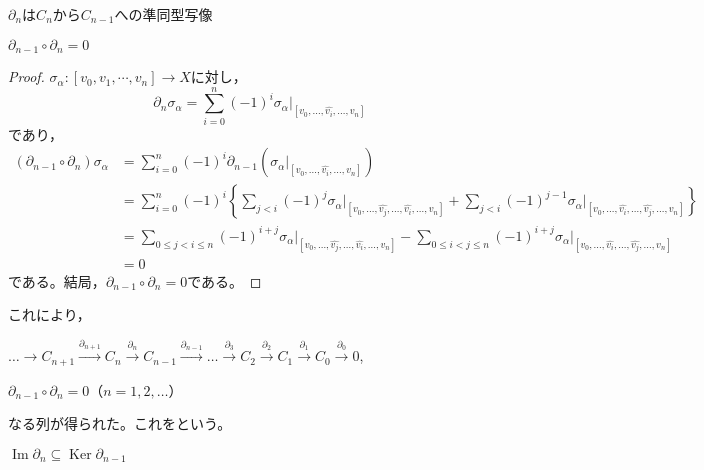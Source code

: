 \documentclass[uplatex]{jsarticle}
\renewcommand{\restriction}[2]{\left. #1 \right|_{#2}}
\DeclareMathOperator{\Image}{Im}
\DeclareMathOperator{\Kernel}{Ker}
\begin{document}
\begin{prop}
  $\partial_{n}$は$C_{n}$から$C_{n-1}$への準同型写像
\end{prop}

\begin{hodai}
  $\partial_{n-1} \circ \partial_{n} = 0$
\end{hodai}

\begin{proof}
  $\sigma_{\alpha} \colon [v_{0},v_{1},\cdots, v_{n}] \longrightarrow X$に対し，
  \begin{equation}
    \partial_{n} \sigma_{\alpha} = \sum_{i=0}^{n} (-1)^{i} \restriction{\sigma_{\alpha}}{[v_{0},\dots,\hat{v_{i}},\dots,v_{n}]}
  \end{equation}
  であり，
  \begin{align}
    (\partial_{n-1}\circ \partial_{n})\sigma_{\alpha} &=
    \sum_{i=0}^{n} (-1)^{i} \partial_{n-1} \left( \restriction{\sigma_{\alpha}}{[v_{0},\dots,\hat{v_{i}},\dots,v_{n}]} \right) \\
    &= \sum_{i=0}^{n} (-1)^{i}
    \left\{ \sum_{j<i} (-1)^{j} \restriction{\sigma_{\alpha}}{[v_{0},\dots,\hat{v_{j}},\dots,\hat{v_{i}},\dots,v_{n}]} + \sum_{j<i} (-1)^{j-1} \restriction{\sigma_{\alpha}}{[v_{0},\dots,\hat{v_{i}},\dots,\hat{v_{j}},\dots,v_{n}]} \right\} \\
    &= \sum_{0 \le j < i \le n} (-1)^{i+j} \restriction{\sigma_{\alpha}}{[v_{0},\dots,\hat{v_{j}},\dots,\hat{v_{i}},\dots,v_{n}]} - \sum_{0 \le i < j \le n} (-1)^{i+j} \restriction{\sigma_{\alpha}}{[v_{0},\dots,\hat{v_{i}},\dots,\hat{v_{j}},\dots,v_{n}]} \\
    &= 0
  \end{align}
  である。結局，$\partial_{n-1} \circ \partial_{n} = 0$である。
\end{proof}

これにより，
\begin{center}
  $\dots \to C_{n+1} \xrightarrow{\partial_{n+1}} C_{n} \xrightarrow{\partial_{n}} C_{n-1} \xrightarrow{\partial_{n-1}} \dots \xrightarrow{\partial_{3}} C_{2} \xrightarrow{\partial_{2}} C_{1} \xrightarrow{\partial_{1}} C_{0} \xrightarrow{\partial_{0}} 0$,

  $\partial_{n-1} \circ \partial_{n} = 0$（$n=1,2,\dots$）
\end{center}
なる列が得られた。これをという。

\begin{prop}
  $\Image \partial_{n} \subseteq \Kernel \partial_{n-1}$
\end{prop}
\end{document}
